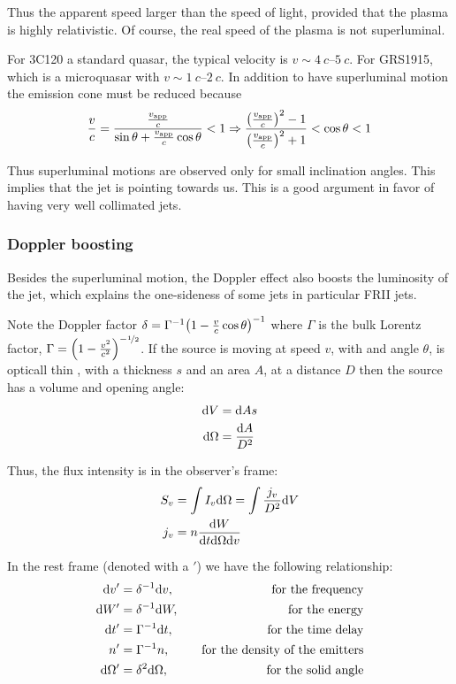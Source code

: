\documentclass[10pt,a4paper,english]{article}
\let\originalleft\left
\let\originalright\right
\renewcommand{\left}{\mathopen{}\mathclose\bgroup\originalleft}
\renewcommand{\right}{\aftergroup\egroup\originalright}
\begin{document}
Thus the apparent speed larger than the speed of light, provided that the
plasma is highly relativistic. Of course, the real speed of the plasma is not
superluminal.

For 3C120 a standard quasar, the typical velocity is $v\sim \SIrange{4}{5}{c}$.
For GRS1915, which is a microquasar with $v\sim \SIrange{1}{2}{c }$. In
addition to have superluminal motion the emission cone must be reduced because
\begin{equation}
    \frac{v}{c } = \frac{\frac{v_\mathrm{app}}{c}}{\sin\theta + \frac{v_\mathrm{app}}{c}\cos{\theta}} < 1 \Rightarrow \frac{\left( \frac{v_\mathrm{app}}{c} \right)^2 - 1 }{\left( \frac{v_\mathrm{app}}{c } \right)^2 + 1} < \cos{\theta} < 1
\end{equation}

Thus superluminal motions are observed only for small inclination angles. This
implies that the jet is pointing towards us. This is a good argument in favor
of having very well collimated jets.

\subsubsection{Doppler boosting}

Besides the superluminal motion, the Doppler effect also boosts the luminosity
of the jet, which explains the one-sideness of some jets in particular FRII
jets.

Note the Doppler factor $\delta = \Gamma^{-1} \left( 1 - \frac{v}{c
}\cos{\theta} \right)^{-1}$ where $\Gamma$ is the bulk Lorentz factor, $\Gamma
= \left( 1 - \frac{v^2}{c^2} \right)^{-\nicefrac{1}{2}}$. If the source is
moving at speed $v$, with and angle $\theta$, is opticall thin , with a
thickness $s$ and an area $A$, at a distance $D$ then the source has a volume
and opening angle:
\begin{align}
    \mathrm{d} V &= \mathrm{d} As \\
    \mathrm{d}\Omega &= \frac{\mathrm{d} A}{D^2}
\end{align}

Thus, the flux intensity is in the observer's frame:
\begin{align}
    S_v &= \int I_v\mathrm{d} \Omega = \int \frac{j_v}{D^2} \mathrm{d} V\\
    j_v &= n \frac{\mathrm{d} W}{\mathrm{d} t\mathrm{d} \Omega \mathrm{d} v}
\end{align}

In the rest frame (denoted with a ${}'$) we have the following
relationship:
\begin{align}
    \mathrm{d} v' &= \delta^{-1}\mathrm{d} v, &\quad \textrm{for the frequency} \\
    \mathrm{d} W' &= \delta^{-1}\mathrm{d} W, &\quad \textrm{for the energy} \\
    \mathrm{d} t' &= \Gamma^{-1}\mathrm{d} t, &\quad \textrm{for the time delay} \\
    n'    &= \Gamma^{-1} n,   &\quad \textrm{for the density of the emitters}\\
    \mathrm{d}\Omega' &= \delta^2\mathrm{d}\Omega, &\quad \textrm{for the solid angle}
\end{align}
\end{document}
